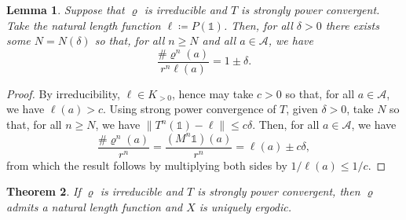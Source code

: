\documentclass[11pt]{amsart}
\numberwithin{equation}{section}
\theoremstyle{plain}
\newtheorem{theorem}{Theorem}[section]
\newtheorem{lemma}[theorem]{Lemma}
\theoremstyle{definition}
\newcommand{\mc}{\mathcal}
\newcommand{\A}{\mc A}
\newcommand{\sub}{\varrho}
\newcommand{\bbo}{\mathds{1}} %
\begin{document}
\begin{lemma}\label{lem:SPC=>growth bound}
Suppose that \(\sub\) is irreducible and \(T\) is strongly power convergent. Take the natural length function \(\ell \coloneqq P(\bbo)\). Then, for all \(\delta > 0\) there exists some \(N = N(\delta)\) so that, for all \(n \geq N\) and all \(a \in \A\), we have
\[
\frac{\# \sub^n(a)}{r^n \ell(a)} = 1 \pm \delta .
\]
\end{lemma}

\begin{proof}
By irreducibility, \(\ell \in K_{>0}\), hence may take \(c > 0\) so that, for all \(a \in \A\), we have \(\ell(a) > c\). Using strong power convergence of \(T\), given \(\delta > 0\), take \(N\) so that, for all \(n \geq N\), we have \(\|T^n(\bbo) - \ell\| \leq c \delta\). Then, for all \(a \in \A\), we have
\[
\frac{\# \sub^n(a)}{r^n} = \frac{(M^n \bbo)(a)}{r^n} = \ell(a) \pm c \delta ,
\]
from which the result follows by multiplying both sides by \(1/\ell(a) \leq 1/c\).
\end{proof}

\begin{theorem}
If \(\sub\) is irreducible and \(T\) is strongly power convergent, then \(\sub\) admits a natural length function and \(X\) is uniquely ergodic.
\end{theorem}
\end{document}
